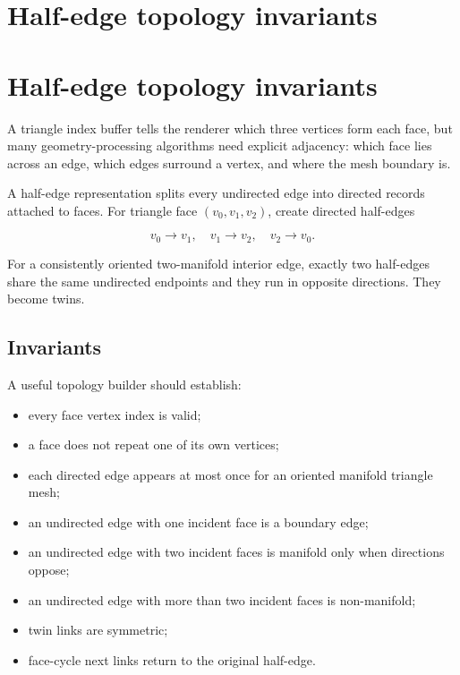 \hypertarget{appendix-faac749c9cdd}{}
\section*{Half-edge topology invariants}
\section{Half-edge topology invariants}\label{half-edge-topology-invariants}

A triangle index buffer tells the renderer which three vertices form each face, but many geometry-processing algorithms need explicit adjacency: which face lies across an edge, which edges surround a vertex, and where the mesh boundary is.

A half-edge representation splits every undirected edge into directed records attached to faces. For triangle face \((v_0,v_1,v_2)\), create directed half-edges

\[
v_0\rightarrow v_1,\quad
v_1\rightarrow v_2,\quad
v_2\rightarrow v_0.
\]

For a consistently oriented two-manifold interior edge, exactly two half-edges share the same undirected endpoints and they run in opposite directions. They become twins.

\subsection{Invariants}\label{invariants}

A useful topology builder should establish:

\begin{itemize}
\tightlist
\item
  every face vertex index is valid;
\item
  a face does not repeat one of its own vertices;
\item
  each directed edge appears at most once for an oriented manifold triangle mesh;
\item
  an undirected edge with one incident face is a boundary edge;
\item
  an undirected edge with two incident faces is manifold only when directions oppose;
\item
  an undirected edge with more than two incident faces is non-manifold;
\item
  twin links are symmetric;
\item
  face-cycle next links return to the original half-edge.
\end{itemize}


